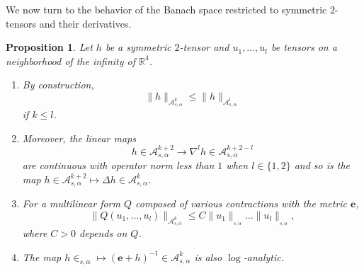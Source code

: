 \documentclass[12pt]{article}
\newtheorem{prop}[thm]{Proposition}
\newcommand{\calA}{{\mathcal A}}
\begin{document}
       We now turn to the behavior of the Banach space restricted to symmetric $2$-tensors and their derivatives.
    
    \begin{prop}\label{properties A epsilon k}
    Let $h$ be a symmetric $2$-tensor and $u_1,...,u_l$ be tensors on a neighborhood of the infinity of $\mathbb{R}^4$. 
    \begin{enumerate}
        \item By construction,
    $$\|h\|_{\calA^k_{s,\alpha}}\leqslant \|h\|_{\calA_{s,\alpha}^l}$$
    if $k\leqslant l$. 
    \item Moreover, the linear maps
    $$ h\in \calA^{k+2}_{s,\alpha}\to \nabla^lh\in \calA^{k+2-l}_{s,\alpha} $$
    are continuous with operator norm less than $1$ when $l\in \{1,2\}$ and so is the map $ h\in \calA^{k+2}_{s,\alpha}\mapsto \Delta h \in \calA^{k}_{s,\alpha}$. 
    \item For a multilinear form $Q$ composed of various contractions with the metric $\mathbf{e}$,
    $$ \|Q(u_1,...,u_l)\|_{\calA^{k}_{s,\alpha}} \leqslant C\|u_1\|_{_{s,\alpha}}\ldots \|u_l\|_{_{s,\alpha}},$$ where $C>0$ depends on $Q$.
    \item The map $h\in _{s,\alpha}\mapsto(\mathbf{e}+h)^{-1}\in \calA^k_{s,\alpha}$ is also $\log$-analytic. 
    \end{enumerate}
    \end{prop}
\end{document}

